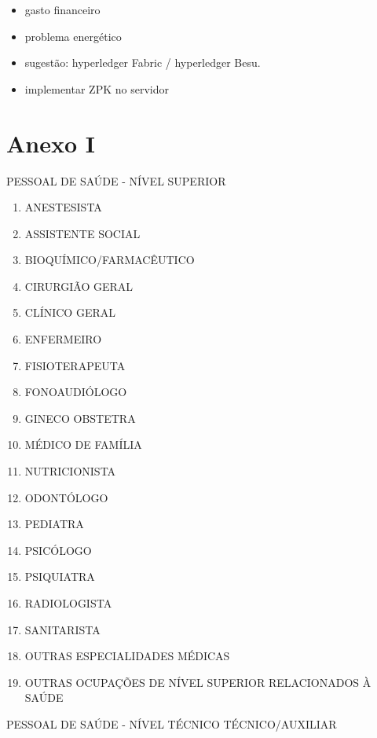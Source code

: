 \documentclass[a4paper,11pt]{article}
\begin{document}
\begin{itemize}
  \item gasto financeiro
  \item problema energético
  \item sugestão: hyperledger Fabric / hyperledger Besu.
  \item implementar ZPK no servidor
\end{itemize}




\newpage
\section{Anexo I}

PESSOAL DE SAÚDE - NÍVEL SUPERIOR
\begin{enumerate}
    \item ANESTESISTA
    \item ASSISTENTE SOCIAL
    \item BIOQUÍMICO/FARMACÊUTICO
    \item CIRURGIÃO GERAL
    \item CLÍNICO GERAL
    \item ENFERMEIRO
    \item FISIOTERAPEUTA
    \item FONOAUDIÓLOGO
    \item GINECO OBSTETRA
    \item MÉDICO DE FAMÍLIA
    \item NUTRICIONISTA
    \item ODONTÓLOGO
    \item PEDIATRA
    \item PSICÓLOGO
    \item PSIQUIATRA
    \item RADIOLOGISTA
    \item SANITARISTA
    \item OUTRAS ESPECIALIDADES MÉDICAS
    \item OUTRAS OCUPAÇÕES DE NÍVEL SUPERIOR RELACIONADOS À SAÚDE
\end{enumerate}
PESSOAL DE SAÚDE - NÍVEL TÉCNICO TÉCNICO/AUXILIAR
\end{document}
